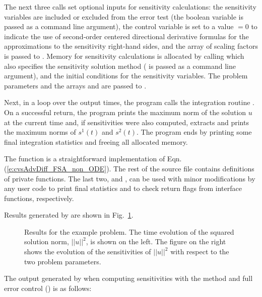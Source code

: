 The next three calls set optional inputs for sensitivity calculations: the sensitivity
variables are included or excluded from the error test (the boolean variable 
is passed as a command line argument), the control variable  is set to a value
 $=0$ to indicate  the use of second-order centered directional derivative
formulas for the approximations to the sensitivity right-hand sides, and the array of
scaling factors  is passed to {\cvodes}.
Memory for sensitivity calculations is allocated by calling 
which also specifies the sensitivity solution method ( is passed
as a command line argument), and the initial conditions for the sensitivity variables.
The problem parameters  and the arrays  and  are
passed to .

Next, in a loop over the  output times, the program calls the integration
routine . On a successful return, the program prints the maximum norm
of the solution $u$ at the current time and, if sensitivities were also computed, 
extracts and prints the maximum norms of $s^1(t)$ and $s^2(t)$.
The program ends by printing some final integration statistics and freeing all
allocated memory.

The  function is a straightforward implementation of Eqn.
(\ref{e:cvsAdvDiff_FSA_non_ODE}).  The rest of the source file
contains definitions of private functions.  The last
two,  and , can be used with minor
modifications by any {\cvodes} user code to print final {\cvodes}
statistics and to check return flags from {\cvodes} interface
functions, respectively.

Results generated by  are shown in Fig.~\ref{f:cvsAdvDiff_FSA_non}. 
\begin{figure}
  {\centerline{}}
  \caption{Results for the  example problem.
    The time evolution of the squared solution norm, $||u||^2$, is shown on the left. 
    The figure on the right shows the evolution of the sensitivities of $||u||^2$
    with respect to the two problem parameters.}
  \label{f:cvsAdvDiff_FSA_non}
\end{figure}
The output generated by  when computing
sensitivities with the  method and full error
control () is as follows:

